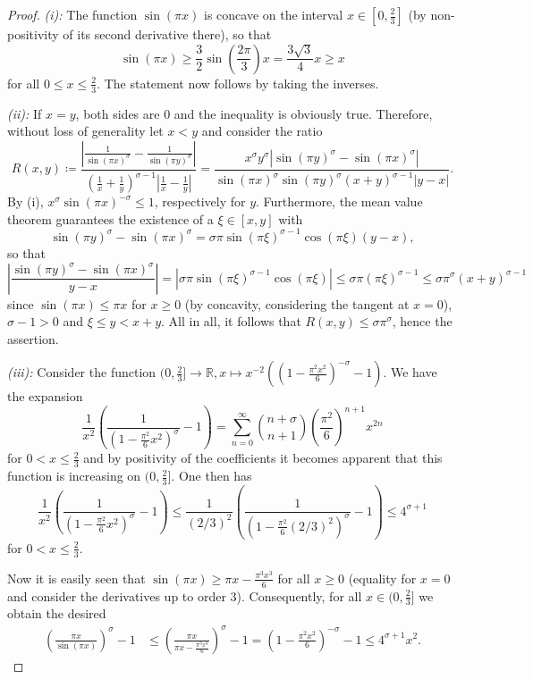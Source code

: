 \documentclass[]{interact}
\newcommand{\bbR}{\mathbb{R}}
\theoremstyle{definition}
\numberwithin{table}{section} %
\numberwithin{figure}{section}
\begin{document}
\begin{proof}
    \textit{(i):} The function $\sin(\pi x)$ is concave on the interval $x \in [0, \frac23]$ (by non-positivity of its second derivative there), so that
    $$
    \sin(\pi x) \geq \frac{3}{2} \sin\left(\frac{2\pi}3\right) x = \frac{3\sqrt3}{4} x \geq x
    $$
    for all $0 \leq x \leq \frac23$. The statement now follows by taking the inverses.

    \textit{(ii):} %
    If $x=y$, both sides are 0 and the inequality is obviously true. Therefore, without loss of generality let $x<y$ and consider the ratio
    $$R(x,y) \coloneqq \frac{\left|\frac1{\sin(\pi x)^\sigma} - \frac1{\sin(\pi y)^\sigma}\right|}{\left(\frac1x + \frac1y\right)^{\sigma-1} \left|\frac1x - \frac1y\right|} = \frac{x^{\sigma}y^\sigma |\sin(\pi y)^\sigma-\sin(\pi x)^\sigma|}{\sin(\pi x)^\sigma\sin(\pi y)^\sigma (x+y)^{\sigma-1}|y-x|}.$$
    By (i), $x^\sigma\sin(\pi x)^{-\sigma}\leq 1$, respectively for $y$. Furthermore, the mean value theorem guarantees the existence of a $\xi\in[x,y]$ with
    $$
    \sin(\pi y)^{\sigma}-\sin(\pi x)^{\sigma} = \sigma\pi\sin(\pi \xi)^{\sigma-1}\cos(\pi\xi)(y-x),
    $$
    so that $$\left| \frac{\sin(\pi y)^\sigma-\sin(\pi x)^\sigma}{y-x}\right|=|\sigma\pi\sin(\pi \xi)^{\sigma-1}\cos(\pi\xi)|\leq\sigma\pi(\pi\xi)^{\sigma-1}\leq\sigma\pi^\sigma (x+y)^{\sigma-1}$$ since $\sin(\pi x)\leq \pi x$ for $x\geq0$ (by concavity, considering the tangent at $x=0$), $\sigma-1>0$ and $\xi\leq y < x+y$. 
    All in all, it follows that $R(x,y)\leq \sigma\pi^\sigma$, hence the assertion.

    \textit{(iii):} Consider the function $(0, \frac{2}{3}] \rightarrow\bbR, x\mapsto x^{-2}((1-\frac{\pi^{2}x^{2}}{6})^{-\sigma}-1)$. We have the expansion
    $$
    \frac1{x^2}\left(\frac1{\left(1-\frac{\pi^2}6 x^2\right)^\sigma}-1\right) = \sum_{n=0}^\infty {n+\sigma \choose n+1} \left(\frac{\pi^2}{6}\right)^{n+1} x^{2n}
    $$
    for $0 < x \leq \frac23$ and by positivity of the coefficients it becomes apparent that this function is increasing on $(0, \frac23]$. One then has
    $$
    \frac1{x^2}\left(\frac1{\left(1-\frac{\pi^2}6 x^2\right)^\sigma}-1\right) \leq \frac1{(2/3)^2}\left(\frac1{\left(1-\frac{\pi^2}6 (2/3)^2\right)^\sigma}-1\right) \leq  4^{\sigma+1}
$$
for $0 < x \leq \frac23$.
    
    Now it is easily seen that $\sin(\pi x)\geq\pi x -\frac{\pi^{3}x^{3}}{6}$ for all $x\geq 0$ (equality for $x=0$ and consider the derivatives up to order 3). Consequently, for all $x\in(0,\frac{2}{3}]$ we obtain the desired
    \begin{align*}
        \left(\frac{\pi x}{\sin(\pi x)}\right)^{\sigma}-1 &\leq \left(\frac{\pi x}{\pi x -\frac{\pi^{3}x^{3}}{6}}\right)^{\sigma}-1 = \left(1-\frac{\pi^{2}x^{2}}{6}\right)^{-\sigma}  -1 \leq 4^{\sigma+1} x^{2}.
    \end{align*}


\end{proof}
\end{document}
